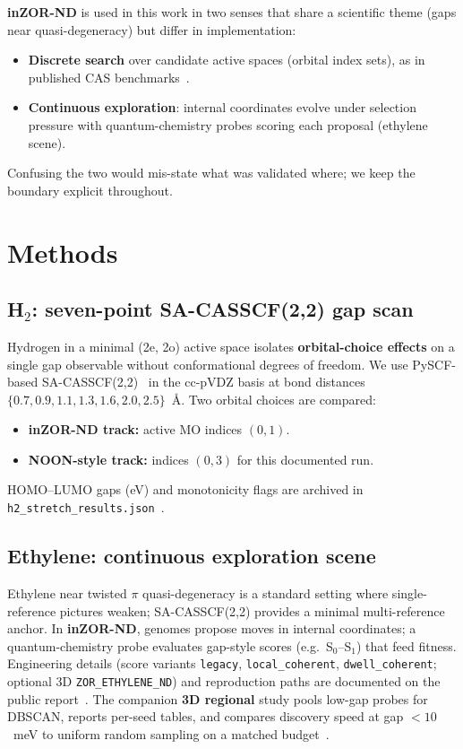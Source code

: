 \documentclass[11pt,a4paper]{article}
\begin{document}
\textbf{inZOR-ND} is used in this work in two senses that share a scientific theme
(gaps near quasi-degeneracy) but differ in implementation:
\begin{itemize}[itemsep=2pt]
  \item \textbf{Discrete search} over candidate active spaces (orbital index
        sets), as in published CAS benchmarks~\citep{inZORNDActiveSpace2026}.
  \item \textbf{Continuous exploration}: internal coordinates evolve under
        selection pressure with quantum-chemistry probes scoring each proposal
        (ethylene scene).
\end{itemize}
Confusing the two would mis-state what was validated where; we keep the
boundary explicit throughout.

\section{Methods}

\subsection{H$_2$: seven-point SA-CASSCF(2,2) gap scan}
Hydrogen in a minimal (2e, 2o) active space isolates \textbf{orbital-choice
effects} on a single gap observable without conformational degrees of freedom.
We use PySCF-based SA-CASSCF(2,2)~\citep{Sun2018PySCF} in the cc-pVDZ basis at
bond distances $\{0.7, 0.9, 1.1, 1.3, 1.6, 2.0, 2.5\}$~\AA. Two orbital
choices are compared:
\begin{itemize}[itemsep=2pt]
  \item \textbf{inZOR-ND track:} active MO indices $(0,1)$.
  \item \textbf{NOON-style track:} indices $(0,3)$ for this documented run.
\end{itemize}
HOMO--LUMO gaps (eV) and monotonicity flags are archived in
\texttt{h2\_stretch\_results.json}~\citep{inZORNDQCGaps2026}.

\subsection{Ethylene: continuous exploration scene}
Ethylene near twisted $\pi$ quasi-degeneracy is a standard setting where
single-reference pictures weaken; SA-CASSCF(2,2) provides a minimal
multi-reference anchor. In \textbf{inZOR-ND}, genomes propose moves in
internal coordinates; a quantum-chemistry probe evaluates gap-style scores
(e.g.\ S$_0$--S$_1$) that feed fitness. Engineering details (score variants
\texttt{legacy}, \texttt{local\_coherent}, \texttt{dwell\_coherent}; optional 3D
\texttt{ZOR\_ETHYLENE\_ND}) and reproduction paths are documented on the public
report~\citep{inZORNDQCGaps2026}. The companion \textbf{3D regional} study
pools low-gap probes for DBSCAN, reports per-seed tables, and compares discovery
speed at gap $<10$~meV to uniform random sampling on a matched
budget~\citep{inZORNDEthylene3D2026}.
\end{document}
